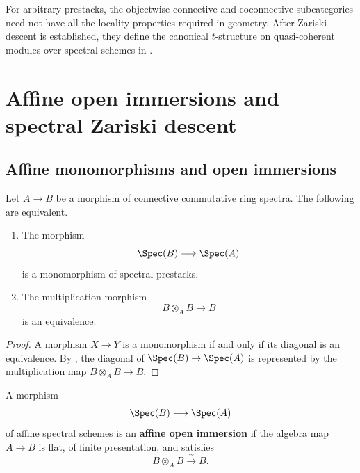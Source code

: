 \begin{remark}
\label{rem:prestack-t-structure}
For arbitrary prestacks, the objectwise connective and coconnective
subcategories need not have all the locality properties required in
geometry. After Zariski descent is established, they define the canonical
$t$-structure on quasi-coherent modules over spectral schemes in
.
\end{remark}

\section{Affine open immersions and spectral Zariski descent}
\label{sec:affine-opens-zariski-descent}

\subsection{Affine monomorphisms and open immersions}

\begin{proposition}
\label{prop:affine-monomorphism-criterion}
Let $A\to B$ be a morphism of connective commutative ring spectra. The
following are equivalent.
\begin{enumerate}[label=(\roman*)]
    \item The morphism
    \[
        \Spec(B)
        \longrightarrow
        \Spec(A)
    \]
    is a monomorphism of spectral prestacks.

    \item The multiplication morphism
    \[
        B\otimes_A B
        \longrightarrow
        B
    \]
    is an equivalence.
\end{enumerate}
\end{proposition}

\begin{proof}
A morphism $X\to Y$ is a monomorphism if and only if its diagonal is an
equivalence. By , the diagonal of
$\Spec(B)\to\Spec(A)$ is represented by the multiplication map
$B\otimes_A B\to B$.
\end{proof}

\begin{definition}
\label{def:affine-open-immersion-spectral}
A morphism
\[
    \Spec(B)
    \longrightarrow
    \Spec(A)
\]
of affine spectral schemes is an \textbf{affine open immersion} if the
algebra map $A\to B$ is flat, of finite presentation, and satisfies
\[
    B\otimes_A B
    \xrightarrow{\simeq}
    B.
\]
\end{definition}

